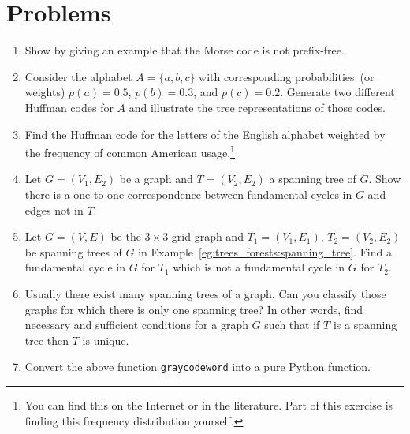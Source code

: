 
\section{Problems}

\begin{enumerate}
\item Show by giving an example that the Morse code is not
  prefix-free.

\item Consider the alphabet $A = \{a,b,c\}$ with corresponding
  probabilities~(or weights) $p(a) = 0.5$, $p(b) = 0.3$, and
  $p(c) = 0.2$. Generate two different Huffman codes for $A$ and
  illustrate the tree representations of those codes.

\item Find the Huffman code for the letters of the English alphabet
  weighted by the frequency of common American usage.\footnote{
    You can find this on the Internet or in the literature. Part of
    this exercise is finding this frequency distribution yourself.}

\item Let $G=(V_1,E_2)$ be a graph and $T=(V_2,E_2)$ a spanning tree
  of $G$. Show there is a one-to-one correspondence between
  fundamental cycles in $G$ and edges not in $T$.

\item Let $G=(V, E)$ be the $3\times 3$ grid graph and $T_1=(V_1,E_1)$,
  $T_2=(V_2,E_2)$ be spanning trees of $G$ in
  Example~\ref{eg:trees_forests:spanning_tree}. Find a fundamental
  cycle in $G$ for $T_1$ which is not a fundamental cycle in $G$ for
  $T_2$.

\item Usually there exist many spanning trees of a graph. Can you
  classify those graphs for which there is only one spanning tree? In
  other words, find necessary and sufficient conditions for a graph
  $G$ such that if $T$ is a spanning tree then $T$ is unique.

\item Convert the above function {\tt graycodeword} into a pure Python
  function.
\end{enumerate}
